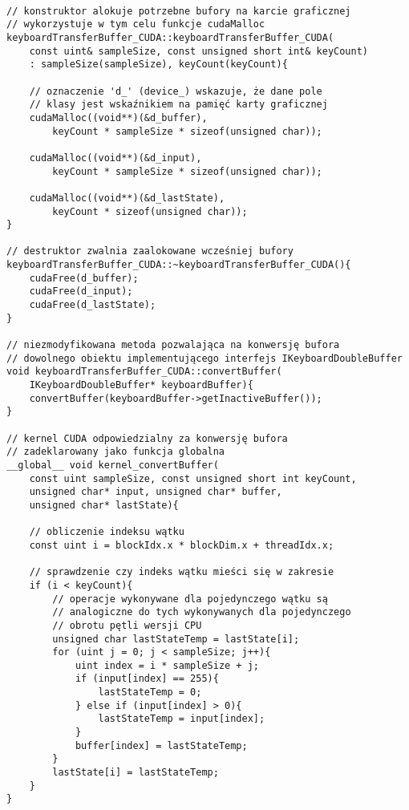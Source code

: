 \begin{lstlisting}

// konstruktor alokuje potrzebne bufory na karcie graficznej
// wykorzystuje w tym celu funkcje cudaMalloc
keyboardTransferBuffer_CUDA::keyboardTransferBuffer_CUDA(
    const uint& sampleSize, const unsigned short int& keyCount)
    : sampleSize(sampleSize), keyCount(keyCount){

    // oznaczenie 'd_' (device_) wskazuje, że dane pole
    // klasy jest wskaźnikiem na pamięć karty graficznej
    cudaMalloc((void**)(&d_buffer),
        keyCount * sampleSize * sizeof(unsigned char));

    cudaMalloc((void**)(&d_input),
        keyCount * sampleSize * sizeof(unsigned char));

    cudaMalloc((void**)(&d_lastState),
        keyCount * sizeof(unsigned char));
}

// destruktor zwalnia zaalokowane wcześniej bufory
keyboardTransferBuffer_CUDA::~keyboardTransferBuffer_CUDA(){
    cudaFree(d_buffer);
    cudaFree(d_input);
    cudaFree(d_lastState);
}

// niezmodyfikowana metoda pozwalająca na konwersję bufora
// dowolnego obiektu implementującego interfejs IKeyboardDoubleBuffer
void keyboardTransferBuffer_CUDA::convertBuffer(
    IKeyboardDoubleBuffer* keyboardBuffer){
    convertBuffer(keyboardBuffer->getInactiveBuffer());
}

// kernel CUDA odpowiedzialny za konwersję bufora
// zadeklarowany jako funkcja globalna
__global__ void kernel_convertBuffer(
    const uint sampleSize, const unsigned short int keyCount, 
    unsigned char* input, unsigned char* buffer,
    unsigned char* lastState){
    
    // obliczenie indeksu wątku
    const uint i = blockIdx.x * blockDim.x + threadIdx.x;

    // sprawdzenie czy indeks wątku mieści się w zakresie
    if (i < keyCount){
        // operacje wykonywane dla pojedynczego wątku są
        // analogiczne do tych wykonywanych dla pojedynczego 
        // obrotu pętli wersji CPU
        unsigned char lastStateTemp = lastState[i];
        for (uint j = 0; j < sampleSize; j++){
            uint index = i * sampleSize + j;
            if (input[index] == 255){
                lastStateTemp = 0;
            } else if (input[index] > 0){
                lastStateTemp = input[index];
            }
            buffer[index] = lastStateTemp;
        }
        lastState[i] = lastStateTemp;
    }    
}


\end{lstlisting}
